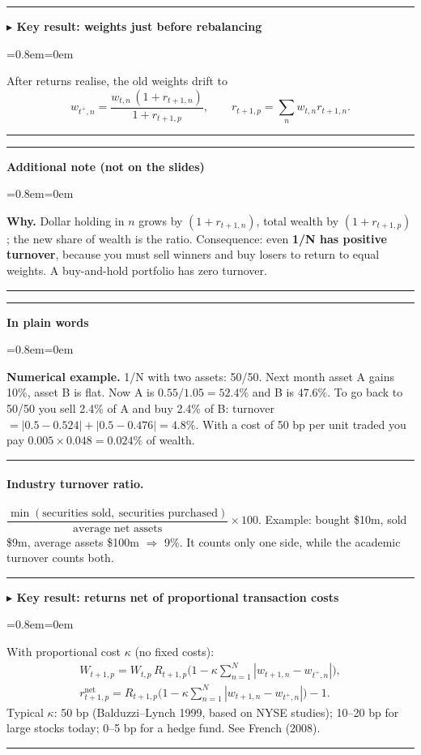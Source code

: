 \documentclass[11pt,a4paper]{report}
\newenvironment{notebox}[1]
  {\par\medskip\Needspace{6\baselineskip}\noindent\rule{\linewidth}{0.4pt}\par\nopagebreak
   \noindent\textbf{#1}\par\nopagebreak
   \begin{list}{}{\leftmargin=0.8em\rightmargin=0em\topsep=2pt}\item[]}
  {\end{list}\nopagebreak\noindent\rule{\linewidth}{0.4pt}\par\medskip}
\newenvironment{keybox}[1][]{\begin{notebox}{$\blacktriangleright$ Key result#1}}{\end{notebox}}
\newenvironment{plainbox}{\begin{notebox}{In plain words}}{\end{notebox}}
\newenvironment{addnote}{\begin{notebox}{Additional note (not on the slides)}}{\end{notebox}}
\begin{document}
\begin{keybox}[: weights just before rebalancing]
After returns realise, the old weights drift to
\[
w_{t^+,n}=\frac{w_{t,n}\,(1+r_{t+1,n})}{1+r_{t+1,p}},\qquad r_{t+1,p}=\sum_n w_{t,n}r_{t+1,n}.
\]
\end{keybox}
\begin{addnote}
\textbf{Why.} Dollar holding in $n$ grows by $(1+r_{t+1,n})$, total wealth by
$(1+r_{t+1,p})$; the new share of wealth is the ratio. Consequence: even
\textbf{1/N has positive turnover}, because you must sell winners and buy losers
to return to equal weights. A buy-and-hold portfolio has zero turnover.
\end{addnote}

\begin{plainbox}
\textbf{Numerical example.} 1/N with two assets: 50/50. Next month asset A gains
10\%, asset B is flat. Now A is $0.55/1.05=52.4\%$ and B is $47.6\%$. To go back to
50/50 you sell 2.4\% of A and buy 2.4\% of B: turnover $=|0.5-0.524|+|0.5-0.476|=4.8\%$.
With a cost of 50 bp per unit traded you pay $0.005\times0.048=0.024\%$ of wealth.
\end{plainbox}
\paragraph{Industry turnover ratio.}
$\dfrac{\min(\text{securities sold},\ \text{securities purchased})}{\text{average net assets}}\times100$.
Example: bought \$10m, sold \$9m, average assets \$100m $\Rightarrow$ 9\%.
It counts only one side, while the academic turnover counts both.

\begin{keybox}[: returns net of proportional transaction costs]
With proportional cost $\kappa$ (no fixed costs):
\begin{gather*}
W_{t+1,p}=W_{t,p}\,R_{t+1,p}\Big(1-\kappa\sum_{n=1}^N|w_{t+1,n}-w_{t^+,n}|\Big),\\
r^{\text{net}}_{t+1,p}=R_{t+1,p}\Big(1-\kappa\sum_{n=1}^N|w_{t+1,n}-w_{t^+,n}|\Big)-1 .
\end{gather*}
Typical $\kappa$: 50 bp (Balduzzi--Lynch 1999, based on NYSE studies);
10--20 bp for large stocks today; 0--5 bp for a hedge fund. See French (2008).
\end{keybox}
\end{document}
